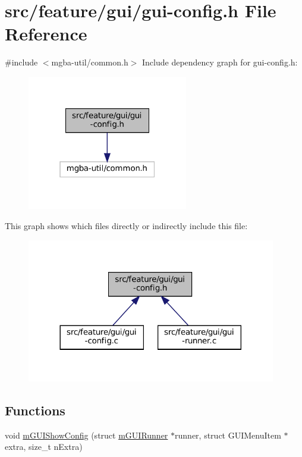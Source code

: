 \hypertarget{gui-config_8h}{}\section{src/feature/gui/gui-\/config.h File Reference}
\label{gui-config_8h}
{\ttfamily \#include $<$mgba-\/util/common.\+h$>$}\newline
Include dependency graph for gui-\/config.h\+:
\nopagebreak
\begin{figure}[H]
\begin{center}
\leavevmode
\includegraphics[width=199pt]{gui-config_8h__incl}
\end{center}
\end{figure}
This graph shows which files directly or indirectly include this file\+:
\nopagebreak
\begin{figure}[H]
\begin{center}
\leavevmode
\includegraphics[width=308pt]{gui-config_8h__dep__incl}
\end{center}
\end{figure}
\subsection*{Functions}
\begin{DoxyCompactItemize}
\item 
void \mbox{\hyperlink{gui-config_8h_a505ebe8c0708157c31aff0d023cb6631}{m\+G\+U\+I\+Show\+Config}} (struct \mbox{\hyperlink{structm_g_u_i_runner}{m\+G\+U\+I\+Runner}} $\ast$runner, struct G\+U\+I\+Menu\+Item $\ast$extra, size\+\_\+t n\+Extra)
\end{DoxyCompactItemize}


